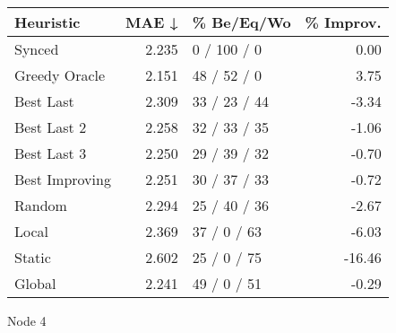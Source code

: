 \begin{tabular}{lrlr}
\toprule
\textbf{Heuristic} & \textbf{MAE ↓} & \textbf{\% Be/Eq/Wo} & \textbf{\% Improv.} \\
\midrule
            Synced &          2.235 &          0 / 100 / 0 &                0.00 \\
     Greedy Oracle &          2.151 &          48 / 52 / 0 &                3.75 \\
         Best Last &          2.309 &         33 / 23 / 44 &               -3.34 \\
       Best Last 2 &          2.258 &         32 / 33 / 35 &               -1.06 \\
       Best Last 3 &          2.250 &         29 / 39 / 32 &               -0.70 \\
    Best Improving &          2.251 &         30 / 37 / 33 &               -0.72 \\
            Random &          2.294 &         25 / 40 / 36 &               -2.67 \\
             Local &          2.369 &          37 / 0 / 63 &               -6.03 \\
            Static &          2.602 &          25 / 0 / 75 &              -16.46 \\
            Global &          2.241 &          49 / 0 / 51 &               -0.29 \\
\bottomrule
\end{tabular}
\caption{Node 4}
\label{tab:hr_non_lr05_le2_bs2_4}
